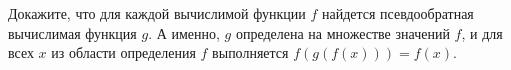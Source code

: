 Докажите, что для каждой вычислимой функции $f$ найдется псевдообратная вычислимая функция $g$. А именно, $g$ определена на
множестве значений $f$, и для всех $x$ из области определения $f$ выполняется $f(g(f(x))) = f(x)$.